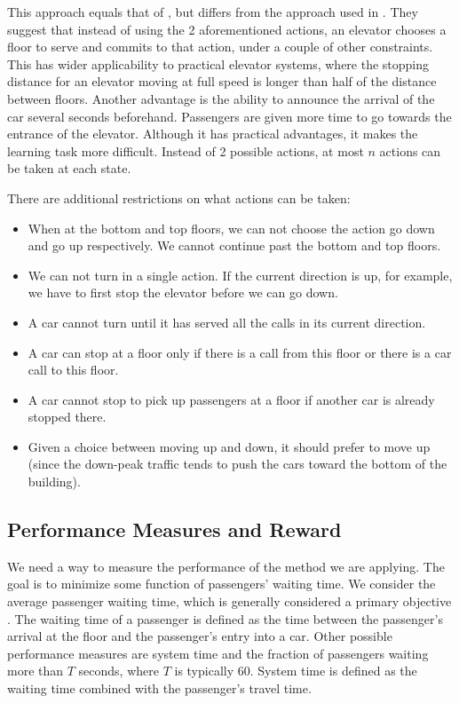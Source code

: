 This approach equals that of \cite{crites_barto_1998, crites_barto_group_1998}, but differs from the approach used in \cite{walczak2006}. They suggest that instead of using the 2 aforementioned actions, an elevator chooses a floor to serve and commits to that action, under a couple of other constraints. This has wider applicability to practical elevator systems, where the stopping distance for an elevator moving at full speed is longer than half of the distance between floors. Another advantage is the ability to announce the arrival of the car several seconds beforehand. Passengers are given more time to go towards the entrance of the elevator. Although it has practical advantages, it makes the learning task more difficult. Instead of 2 possible actions, at most $n$ actions can be taken at each state.

There are additional restrictions on what actions can be taken:

\begin{itemize}
    \item When at the bottom and top floors, we can not choose the action go down and go up respectively. We cannot continue past the bottom and top floors.
    \item We can not turn in a single action. If the current direction is up, for example, we have to first stop the elevator before we can go down.
    \item A car cannot turn until it has served all the calls in its current direction.
    \item A car can stop at a floor only if there is a call from this floor or there
    is a car call to this floor.
    \item A car cannot stop to pick up passengers at a floor if another car is already stopped there.
    \item Given a choice between moving up and down, it should prefer to move up (since
    the down-peak traffic tends to push the cars toward the bottom of the building).
\end{itemize}

\subsection{Performance Measures and Reward}

We need a way to measure the performance of the method we are applying. The goal is to minimize some function of passengers' waiting time. We consider the average passenger waiting time, which is generally considered a primary objective \cite{elevator_dynamics}. The waiting time of a passenger is defined as the time between the passenger's arrival at the floor and the passenger's entry into a car. Other possible performance measures are system time and the fraction of passengers waiting more than $T$ seconds, where $T$ is typically 60. System time is defined as the waiting time combined with the passenger's travel time.


